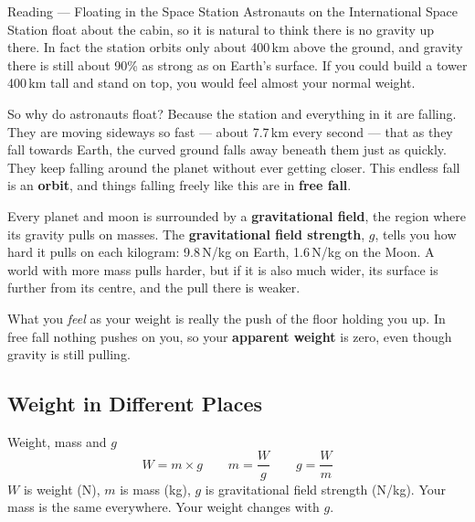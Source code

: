 \begin{readingbox}{Reading --- Floating in the Space Station}
Astronauts on the International Space Station float about the cabin, so it is natural to think there is no gravity up there. In fact the station orbits only about 400\,km above the ground, and gravity there is still about 90\% as strong as on Earth's surface. If you could build a tower 400\,km tall and stand on top, you would feel almost your normal weight.

So why do astronauts float? Because the station and everything in it are falling. They are moving sideways so fast --- about 7.7\,km every second --- that as they fall towards Earth, the curved ground falls away beneath them just as quickly. They keep falling around the planet without ever getting closer. This endless fall is an \textbf{orbit}, and things falling freely like this are in \textbf{free fall}.

Every planet and moon is surrounded by a \textbf{gravitational field}, the region where its gravity pulls on masses. The \textbf{gravitational field strength}, $g$, tells you how hard it pulls on each kilogram: 9.8\,N/kg on Earth, 1.6\,N/kg on the Moon. A world with more mass pulls harder, but if it is also much wider, its surface is further from its centre, and the pull there is weaker.

What you \emph{feel} as your weight is really the push of the floor holding you up. In free fall nothing pushes on you, so your \textbf{apparent weight} is zero, even though gravity is still pulling.
\end{readingbox}

\rcreset
{}

\label{theory:1}

\subsection{Weight in Different Places}\label{sub:a1.1}

\begin{skillbox}{Weight, mass and $g$}
\[ W = m \times g \qquad m = \frac{W}{g} \qquad g = \frac{W}{m} \]
$W$ is weight (N), $m$ is mass (kg), $g$ is gravitational field strength (N/kg). Your mass is the same everywhere. Your weight changes with $g$.
\end{skillbox}

